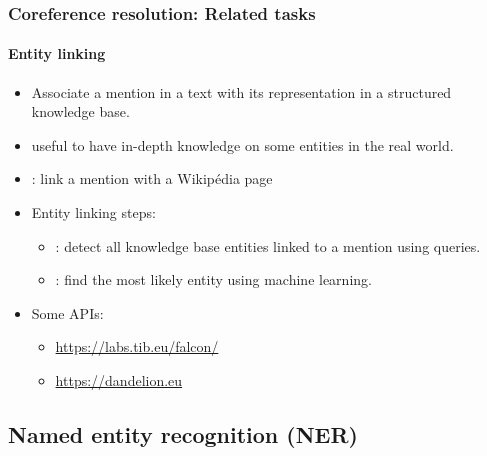 \documentclass[xcolor=table]{beamer}
\begin{document}
\begin{frame}
	\frametitle{Coreference resolution: Related tasks}
	\framesubtitle{Entity linking}
	
	\begin{itemize}
		\item Associate a mention in a text with its representation in a structured knowledge base.
		\item useful to have in-depth knowledge on some entities in the real world.
		\item {}: link a mention with a Wikipédia page
		\item Entity linking steps: 
		\begin{itemize}
			\item {}: detect all knowledge base entities linked to a mention using queries.
			\item {}: find the most likely entity using machine learning.
		\end{itemize}
		\item Some APIs: 
		\begin{itemize}
			\item \url{https://labs.tib.eu/falcon/}
			\item \url{https://dandelion.eu}
		\end{itemize}
	\end{itemize}
	
\end{frame}

\subsection{Named entity recognition (NER)}
\end{document}
